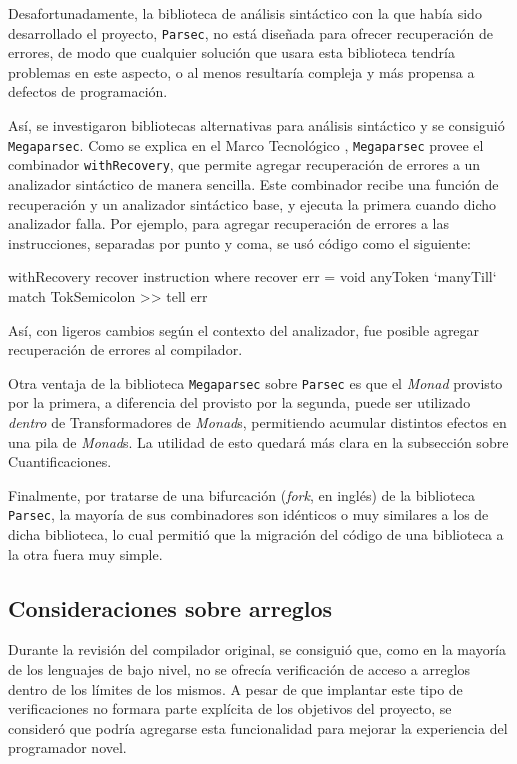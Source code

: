 Desafortunadamente, la biblioteca de análisis sintáctico con la que había sido
desarrollado el proyecto, \texttt{Parsec}, no está diseñada para ofrecer
recuperación de errores, de modo que cualquier solución que usara esta
biblioteca tendría problemas en este aspecto, o al menos resultaría compleja y
más propensa a defectos de programación.

Así, se investigaron bibliotecas alternativas para análisis sintáctico y se
consiguió \texttt{Megaparsec}. Como se explica en el Marco Tecnológico
, \texttt{Megaparsec} provee el
combinador \texttt{withRecovery}, que permite agregar recuperación de errores a
un analizador sintáctico de manera sencilla. Este combinador recibe una función
de recuperación y un analizador sintáctico base, y ejecuta la primera cuando
dicho analizador falla. Por ejemplo, para agregar recuperación de errores a las
instrucciones, separadas por punto y coma, se usó código como el siguiente:

\begin{haskellcode}
  withRecovery recover instruction
    where
      recover err = void anyToken `manyTill` match TokSemicolon >> tell err
\end{haskellcode}

Así, con ligeros cambios según el contexto del analizador, fue posible agregar
recuperación de errores al compilador.

Otra ventaja de la biblioteca \texttt{Megaparsec} sobre \texttt{Parsec} es que
el \emph{Monad} provisto por la primera, a diferencia del provisto por la
segunda, puede ser utilizado \emph{dentro} de Transformadores de \emph{Monad}s,
permitiendo acumular distintos efectos en una pila de \emph{Monad}s. La utilidad
de esto quedará más clara en la subsección sobre Cuantificaciones.

Finalmente, por tratarse de una bifurcación (\emph{fork}, en inglés) de la
biblioteca \texttt{Parsec}, la mayoría de sus combinadores son idénticos o muy
similares a los de dicha biblioteca, lo cual permitió que la migración del
código de una biblioteca a la otra fuera muy simple.

\subsection{Consideraciones sobre arreglos}

Durante la revisión del compilador original, se consiguió que, como en la
mayoría de los lenguajes de bajo nivel, no se ofrecía verificación de acceso a
arreglos dentro de los límites de los mismos. A pesar de que implantar este tipo
de verificaciones no formara parte explícita de los objetivos del proyecto, se
consideró que podría agregarse esta funcionalidad para mejorar la experiencia
del programador novel.

